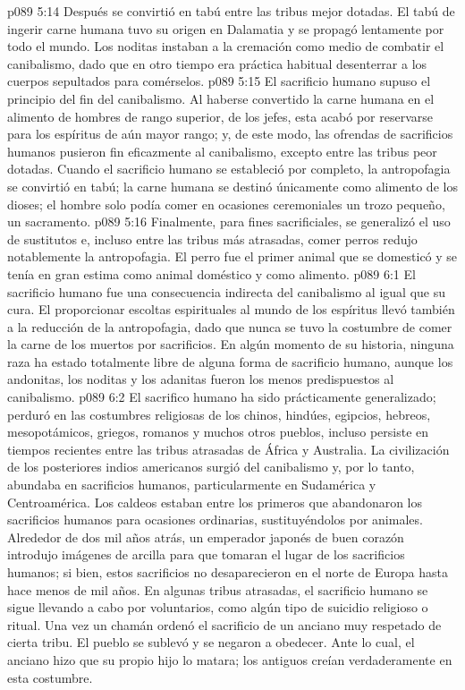 \vs p089 5:14 Después se convirtió en tabú entre las tribus mejor dotadas. El tabú de ingerir carne humana tuvo su origen en Dalamatia y se propagó lentamente por todo el mundo. Los noditas instaban a la cremación como medio de combatir el canibalismo, dado que en otro tiempo era práctica habitual desenterrar a los cuerpos sepultados para comérselos.
\vs p089 5:15 El sacrificio humano supuso el principio del fin del canibalismo. Al haberse convertido la carne humana en el alimento de hombres de rango superior, de los jefes, esta acabó por reservarse para los espíritus de aún mayor rango; y, de este modo, las ofrendas de sacrificios humanos pusieron fin eficazmente al canibalismo, excepto entre las tribus peor dotadas. Cuando el sacrificio humano se estableció por completo, la antropofagia se convirtió en tabú; la carne humana se destinó únicamente como alimento de los dioses; el hombre solo podía comer en ocasiones ceremoniales un trozo pequeño, un sacramento.
\vs p089 5:16 \pc Finalmente, para fines sacrificiales, se generalizó el uso de sustitutos e, incluso entre las tribus más atrasadas, comer perros redujo notablemente la antropofagia. El perro fue el primer animal que se domesticó y se tenía en gran estima como animal doméstico y como alimento.
\vs p089 6:1 El sacrificio humano fue una consecuencia indirecta del canibalismo al igual que su cura. El proporcionar escoltas espirituales al mundo de los espíritus llevó también a la reducción de la antropofagia, dado que nunca se tuvo la costumbre de comer la carne de los muertos por sacrificios. En algún momento de su historia, ninguna raza ha estado totalmente libre de alguna forma de sacrificio humano, aunque los andonitas, los noditas y los adanitas fueron los menos predispuestos al canibalismo.
\vs p089 6:2 El sacrifico humano ha sido prácticamente generalizado; perduró en las costumbres religiosas de los chinos, hindúes, egipcios, hebreos, mesopotámicos, griegos, romanos y muchos otros pueblos, incluso persiste en tiempos recientes entre las tribus atrasadas de África y Australia. La civilización de los posteriores indios americanos surgió del canibalismo y, por lo tanto, abundaba en sacrificios humanos, particularmente en Sudamérica y Centroamérica. Los caldeos estaban entre los primeros que abandonaron los sacrificios humanos para ocasiones ordinarias, sustituyéndolos por animales. Alrededor de dos mil años atrás, un emperador japonés de buen corazón introdujo imágenes de arcilla para que tomaran el lugar de los sacrificios humanos; si bien, estos sacrificios no desaparecieron en el norte de Europa hasta hace menos de mil años. En algunas tribus atrasadas, el sacrificio humano se sigue llevando a cabo por voluntarios, como algún tipo de suicidio religioso o ritual. Una vez un chamán ordenó el sacrificio de un anciano muy respetado de cierta tribu. El pueblo se sublevó y se negaron a obedecer. Ante lo cual, el anciano hizo que su propio hijo lo matara; los antiguos creían verdaderamente en esta costumbre.
